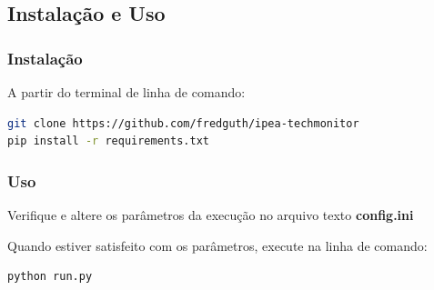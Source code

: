 \documentclass[paper=a4, fontsize=11pt]{scrartcl}
\numberwithin{equation}{section}		%
\numberwithin{figure}{section}			%
\numberwithin{table}{section}				%
\begin{document}
\subsection{Instalação e Uso}

\subsubsection{Instalação}
A partir do terminal de linha de comando:
\begin{lstlisting}[language=bash, frame=leftline, basicstyle=\footnotesize\ttfamily] 
git clone https://github.com/fredguth/ipea-techmonitor
pip install -r requirements.txt
\end{lstlisting}

\subsubsection{Uso}
Verifique e altere os parâmetros da execução no arquivo texto \textbf{config.ini}\label{config.ini}

Quando estiver satisfeito com os parâmetros, execute na linha de comando:
\begin{lstlisting}[language=bash, frame=leftline,basicstyle=\footnotesize\ttfamily] 
python run.py
\end{lstlisting}



\end{document}
